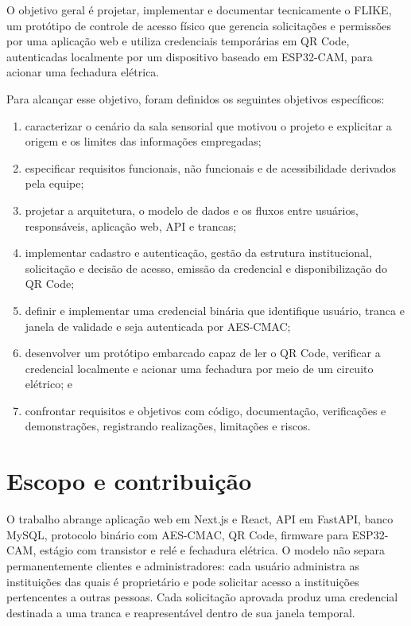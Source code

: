 O objetivo geral é projetar, implementar e documentar tecnicamente o FLIKE, um protótipo de controle de acesso físico que gerencia solicitações e permissões por uma aplicação web e utiliza credenciais temporárias em QR Code, autenticadas localmente por um dispositivo baseado em ESP32-CAM, para acionar uma fechadura elétrica.

Para alcançar esse objetivo, foram definidos os seguintes objetivos específicos:

\begin{enumerate}
    \item caracterizar o cenário da sala sensorial que motivou o projeto e explicitar a origem e os limites das informações empregadas;
    \item especificar requisitos funcionais, não funcionais e de acessibilidade derivados pela equipe;
    \item projetar a arquitetura, o modelo de dados e os fluxos entre usuários, responsáveis, aplicação web, API e trancas;
    \item implementar cadastro e autenticação, gestão da estrutura institucional, solicitação e decisão de acesso, emissão da credencial e disponibilização do QR Code;
    \item definir e implementar uma credencial binária que identifique usuário, tranca e janela de validade e seja autenticada por AES-CMAC;
    \item desenvolver um protótipo embarcado capaz de ler o QR Code, verificar a credencial localmente e acionar uma fechadura por meio de um circuito elétrico; e
    \item confrontar requisitos e objetivos com código, documentação, verificações e demonstrações, registrando realizações, limitações e riscos.
\end{enumerate}

\section{Escopo e contribuição}

O trabalho abrange aplicação web em Next.js e React, API em FastAPI, banco MySQL, protocolo binário com AES-CMAC, QR Code, firmware para ESP32-CAM, estágio com transistor e relé e fechadura elétrica. O modelo não separa permanentemente clientes e administradores: cada usuário administra as instituições das quais é proprietário e pode solicitar acesso a instituições pertencentes a outras pessoas. Cada solicitação aprovada produz uma credencial destinada a uma tranca e reapresentável dentro de sua janela temporal.

